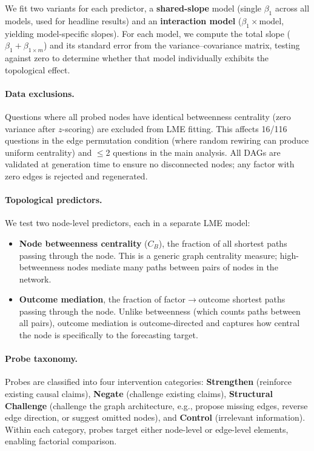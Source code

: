 \documentclass[11pt]{article}
\begin{document}
We fit two variants for each predictor, a \textbf{shared-slope} model (single $\beta_1$ across all models, used for headline results) and an \textbf{interaction model} ($\beta_1 \times \text{model}$, yielding model-specific slopes). For each model, we compute the total slope ($\beta_1 + \beta_{1 \times m}$) and its standard error from the variance--covariance matrix, testing against zero to determine whether that model individually exhibits the topological effect.

\paragraph{Data exclusions.}
Questions where all probed nodes have identical betweenness centrality (zero variance after $z$-scoring) are excluded from LME fitting. This affects 16/116 questions in the edge permutation condition (where random rewiring can produce uniform centrality) and $\leq$2 questions in the main analysis. All DAGs are validated at generation time to ensure no disconnected nodes; any factor with zero edges is rejected and regenerated.

\paragraph{Topological predictors.}
We test two node-level predictors, each in a separate LME model:

\begin{itemize}
    \item \textbf{Node betweenness centrality} ($C_B$), the fraction of all shortest paths passing through the node. This is a generic graph centrality measure; high-betweenness nodes mediate many paths between pairs of nodes in the network.
    \item \textbf{Outcome mediation}, the fraction of factor$\rightarrow$outcome shortest paths passing through the node. Unlike betweenness (which counts paths between all pairs), outcome mediation is outcome-directed and captures how central the node is specifically to the forecasting target.
\end{itemize}

\paragraph{Probe taxonomy.}
Probes are classified into four intervention categories: \textbf{Strengthen} (reinforce existing causal claims), \textbf{Negate} (challenge existing claims), \textbf{Structural Challenge} (challenge the graph architecture, e.g., propose missing edges, reverse edge direction, or suggest omitted nodes), and \textbf{Control} (irrelevant information). Within each category, probes target either node-level or edge-level elements, enabling factorial comparison.
\end{document}

